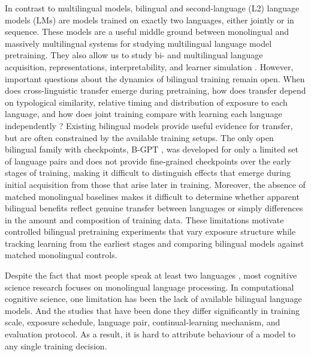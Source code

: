 \documentclass[11pt]{article}
\begin{document}
In contrast to multilingual models, bilingual and second-language (L2) language models (LMs) are models trained on exactly two languages, either jointly or in sequence. These models are a useful middle ground between monolingual and massively multilingual systems for studying multilingual language model pretraining. They also allow us to study bi- and multilingual language acquisition, representations, interpretability, and learner simulation \citep{frank2021toward,yadavalli-etal-2023-slabert, oba-etal-2023-second, aoyama2024modeling, constantinescu2025investigating, arnett-etal-2025-acquisition}. However, important questions about the dynamics of bilingual training remain open. When does cross-linguistic transfer emerge during pretraining, how does transfer depend on typological similarity, relative timing and distribution of exposure to each language, and how does joint training compare with learning each language independently \citep{chang-etal-2022-geometry,blevins2022analyzing,wang2024probing,rajaee2024analyzing,korner-etal-2026-meanings, zhou2026crosslingualalignmentjointtraining}? Existing bilingual models provide useful evidence for transfer, but are often constrained by the available training setups. The only open bilingual family with checkpoints, B-GPT \citep{arnett-etal-2025-acquisition}, was developed for only a limited set of language pairs and does not provide fine-grained checkpoints over the early stages of training, making it difficult to distinguish effects that emerge during initial acquisition from those that arise later in training. Moreover, the absence of matched monolingual baselines makes it difficult to determine whether apparent bilingual benefits reflect genuine transfer between languages or simply differences in the amount and composition of training data. These limitations motivate controlled bilingual pretraining experiments that vary exposure structure while tracking learning from the earliest stages and comparing bilingual models against matched monolingual controls.


Despite the fact that most people speak at least two languages \citep{grosjean2021life}, most cognitive science research focuses on monolingual language processing. In computational cognitive science, one limitation has been the lack of available bilingual language models.
And the studies that have been done they differ significantly in training scale, exposure schedule, language pair, continual-learning mechanism, and evaluation protocol. As a result, it is hard to attribute behaviour of a model to any single training decision. 
\end{document}
